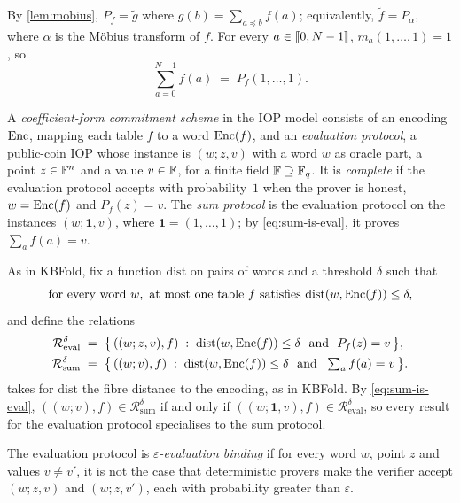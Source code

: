 By \cref{lem:mobius}, $P_f = \tilde g$ where $g(b) = \sum_{a \preceq b} f(a)$; equivalently, $\tilde f = P_{\alpha}$, where $\alpha$ is the M\"obius transform of $f$.
For every $a \in \llbracket 0, N-1 \rrbracket$, $m_a(1,\dots,1) = 1$, so
\begin{equation}\label{eq:sum-is-eval}
  \sum_{a=0}^{N-1} f(a) \;=\; P_f(1,\dots,1).
\end{equation}

\begin{definition}\label{def:pcs}
A \emph{coefficient-form commitment scheme} in the IOP model consists of an encoding $\mathrm{Enc}$, mapping each table $f$ to a word $\mathrm{Enc}(f)$, and an \emph{evaluation protocol}, a public-coin IOP whose instance is $(w; z, v)$ with a word $w$ as oracle part, a point $z \in \mathbb{F}^n$ and a value $v \in \mathbb{F}$, for a finite field $\mathbb{F} \supseteq \mathbb{F}_q$.
It is \emph{complete} if the evaluation protocol accepts with probability~$1$ when the prover is honest, $w = \mathrm{Enc}(f)$ and $P_f(z) = v$.
The \emph{sum protocol} is the evaluation protocol on the instances $(w; \mathbf 1, v)$, where $\mathbf 1 = (1,\dots,1)$; by \eqref{eq:sum-is-eval}, it proves $\sum_a f(a) = v$.
\end{definition}

As in KBFold, fix a function $\mathrm{dist}$ on pairs of words and a threshold $\delta$ such that
\begin{equation}\label{eq:dist-unique}
  \text{for every word } w, \text{ at most one table } f \text{ satisfies } \mathrm{dist}(w, \mathrm{Enc}(f)) \le \delta,
\end{equation}
and define the relations
\begin{align*}
  \mathcal{R}^{\delta}_{\mathrm{eval}} &\;=\; \bigl\{\, ((w; z, v), f) \;:\; \mathrm{dist}(w,\Enc(f)) \le \delta \ \text{ and } \ P_f(z) = v \,\bigr\}, \\
  \mathcal{R}^{\delta}_{\mathrm{sum}} &\;=\; \bigl\{\, ((w; v), f) \;:\; \mathrm{dist}(w,\Enc(f)) \le \delta \ \text{ and } \ \textstyle\sum_a f(a) = v \,\bigr\}.
\end{align*}
 takes for $\mathrm{dist}$ the fibre distance to the encoding, as in KBFold.
By \eqref{eq:sum-is-eval}, $((w;v),f) \in \mathcal{R}^\delta_{\mathrm{sum}}$ if and only if $((w;\mathbf 1, v),f) \in \mathcal{R}^\delta_{\mathrm{eval}}$, so every result for the evaluation protocol specialises to the sum protocol.

\begin{definition}\label{def:binding}
The evaluation protocol is \emph{$\varepsilon$-evaluation binding} if for every word $w$, point $z$ and values $v \ne v'$, it is not the case that deterministic provers make the verifier accept $(w;z,v)$ and $(w;z,v')$, each with probability greater than $\varepsilon$.
\end{definition}

